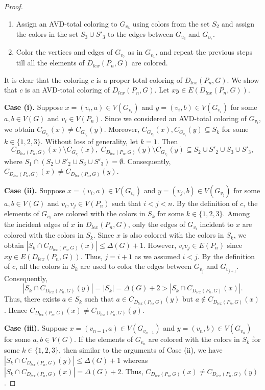 \documentclass[12pt,reqno,a4paper]{amsart}
\theoremstyle{definition}
\theoremstyle{plain}
\begin{document}
\begin{proof}
\begin{enumerate}
    \item Assign an AVD-total coloring to $G_{v_6}$ using colors from the set $S_2$ and assign the colors in the set $S_3\cup S'_3$ to the edges between $G_{v_6}$ and $G_{v_7}$.

    \item Color the vertices and edges of $G_{v_{7}}$ as in $G_{v_{1}}$, and repeat the previous steps till all the elements of $D_{lex}(P_n, G)$ are colored.
\end{enumerate}

It is clear that the coloring $c$ is a proper total coloring of $D_{lex}(P_n,G)$. 
We show that $c$ is an AVD-total coloring of $D_{lex}(P_n,G)$. 
Let $xy\in E(D_{lex}(P_n,G))$. 

\textbf{Case (i).} Suppose $x=(v_i,a)\in V(G_{v_i})$ and $y=(v_i,b)\in V(G_{v_i})$ for some $a,b\in V(G)$ and $v_{i} \in V(P_n)$.
Since we considered an AVD-total coloring of $G_{v_i}$, we obtain $C_{G_{v_i}}(x)\neq C_{G_{v_i}}(y)$.  Moreover, $C_{G_{v_i}}(x), C_{G_{v_i}}(y)\subseteq S_k$ for some $k\in \{1,2,3\}$.
Without loss of generality, let $k=1$. Then
\[
C_{D_{lex}(P_n, G)}(x)\setminus C_{G_{v_i}}(x),\;
C_{D_{lex}(P_n, G)}(y)\setminus C_{G_{v_i}}(y)
\subseteq S_2\cup S'_2\cup S_3 \cup S'_3,
\]
where $S_1 \cap (S_2\cup S'_2\cup S_3 \cup S'_3)=\emptyset$.
Consequently, $C_{D_{lex}(P_n, G)}(x)\neq C_{D_{lex}(P_n, G)}(y)$.
 
\textbf{Case (ii).} Suppose $x=(v_i,a)\in V(G_{v_i})$ and $y=(v_j,b)\in V(G_{v_j})$ for some $a,b\in V(G)$ and $v_i,v_j\in V(P_n)$ such that $i< j<n$. By the definition of $c$, the elements of $G_{v_i}$ are colored with the colors in $S_k$ for some $k\in\{1,2,3\}$.
Among the incident edges of $x$ in $D_{lex}(P_n, G)$, only the edges of $G_{v_i}$ incident to $x$ are colored with the colors in $S_k$. Since $x$ is also colored with the colors in $S_k$, we obtain $|S_k\cap C_{D_{lex}(P_n, G)}(x)|\leq \Delta(G)+1$.
However, $v_iv_j\in E(P_n)$ since $xy\in E(D_{lex}(P_n,G))$. Thus, $j=i+1$ as we assumed $i<j$. 
By the definition of $c$, all the colors in $S_k$ are used to color the edges between $G_{v_j}$ and $G_{v_{j+1}}$.
Consequently, 
\[|S_k\cap C_{D_{lex}(P_n, G)}(y)|= |S_k| = \Delta(G)+2>|S_k\cap C_{D_{lex}(P_n, G)}(x)|.\] 
Thus, there exists $a\in S_k$ such that $a\in C_{D_{lex}(P_n, G)}(y)$ but  $a\not\in C_{D_{lex}(P_n, G)}(x)$. Hence $C_{D_{lex}(P_n, G)}(x)\neq C_{D_{lex}(P_n, G)}(y)$.


\textbf{Case (iii).} Suppose $x=(v_{n-1},a)\in V(G_{v_{n-1}})$ and $y=(v_n,b)\in V(G_{v_n})$ for some $a,b\in V(G)$. If the elements of $G_{v_n}$ are colored with the colors in $S_k$ for some $k\in\{1,2,3\}$, then similar to the arguments of Case (ii), we have $|S_k\cap C_{D_{lex}(P_n, G)}(y)|\leq \Delta(G)+1$ whereas $|S_k\cap C_{D_{lex}(P_n, G)}(x)|= \Delta(G)+2$. Thus, $C_{D_{lex}(P_n, G)}(x)\neq C_{D_{lex}(P_n, G)}(y)$.
\end{proof}
\end{document}
